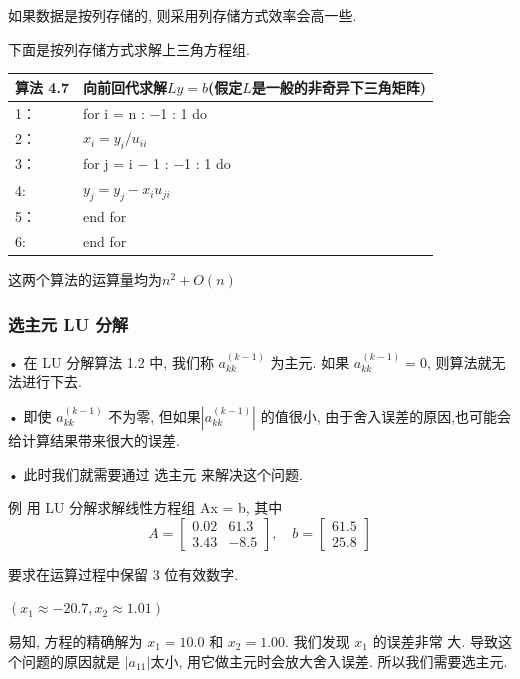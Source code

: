 \documentclass[12pt,a4paper]{article}
\begin{document}
如果数据是按列存储的, 则采用列存储方式效率会高一些.

下面是按列存储方式求解上三角方程组.

\begin{table}  
	\begin{tabular*}{16cm}{ll}  
		\hline  
		算法 4.7 &向前回代求解$Ly =b$(假定$L$是一般的非奇异下三角矩阵)\\  
		\hline  
		1：   & for i = n : −1 : 1 do\\  
		2：   & \qquad $x_{i}=y_{i} / u_{i i}$\\
		3：   & \qquad for j = i − 1 : −1 : 1 do\\
		4:    & \qquad \qquad$y_{j}=y_{j}-x_{i} u_{j i}$\\
		5：   & \qquad end for\\
		6:    & end for\\
		\hline  
	\end{tabular*}  
\end{table}

这两个算法的运算量均为$n^2+O(n)$

\subsubsection{选主元 LU 分解}
• 在 LU 分解算法 1.2 中, 我们称 $a_{k k}^{(k-1)}$ 为主元. 如果 $a_{k k}^{(k-1)}=0$, 则算法就无法进行下去.

• 即使 $a_{k k}^{(k-1)}$ 不为零, 但如果$\left|a_{k k}^{(k-1)}\right|$ 的值很小, 由于舍入误差的原因,也可能会给计算结果带来很大的误差.

• 此时我们就需要通过 选主元 来解决这个问题.


{例} 用 LU 分解求解线性方程组 Ax = b, 其中
\begin{equation}
A=\left[\begin{array}{cc}{0.02} & {61.3} \\ {3.43} & {-8.5}\end{array}\right], \quad b=\left[\begin{array}{c}{61.5} \\ {25.8}\end{array}\right]
\end{equation}

要求在运算过程中保留 3 位有效数字.	

$(x_1 ≈ −20.7, x_2 ≈ 1.01)$


易知, 方程的精确解为 $x_1 = 10.0$ 和 $x_2 = 1.00$. 我们发现 $x_1$ 的误差非常
大. 导致这个问题的原因就是 $|a_{11}| $太小, 用它做主元时会放大舍入误差.
所以我们需要选主元.
\end{document}
